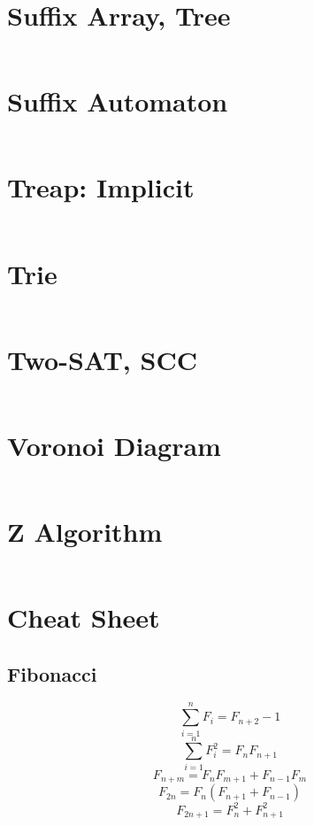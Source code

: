\documentclass{article}
\begin{document}
\begin{multicols}{3}[
	\maketitle
    \begin{center}
        \rule{\textwidth}{2pt}
    \end{center}
]
\section{Suffix Array, Tree}
\inputminted{cpp}{src/SuffixArrayTree.cpp}

\section{Suffix Automaton}
\inputminted{cpp}{src/SuffixAutomaton.cpp}

\section{Treap: Implicit}
\inputminted{cpp}{src/ImplicitTreap.cpp}

\section{Trie}
\inputminted{cpp}{src/Trie.cc}

\section{Two-SAT, SCC}
\inputminted{cpp}{src/TwoSAT.cpp}

\section{Voronoi Diagram}
\inputminted{cpp}{src/VoronoiDiagram.cc}

\section{Z Algorithm}
\inputminted{cpp}{src/ZAlgo.cpp}

\section{Cheat Sheet}

\subsection{Fibonacci}
\begin{equation*}
    \sum \limits_{i = 1}^{n} F_i = F_{n+2} - 1
\end{equation*}
\begin{equation*}
    \sum \limits_{i = 1}^{n} F_i^2 = F_{n}F_{n+1}
\end{equation*}
\begin{equation*}
    F_{n+m} = F_nF_{m+1} + F_{n-1}F_m
\end{equation*}
\begin{equation*}
    F_{2n} = F_n(F_{n+1} + F_{n-1})
\end{equation*}
\begin{equation*}
    F_{2n+1} = F_n^2 + F_{n+1}^2
\end{equation*}


\end{multicols}
\end{document}
